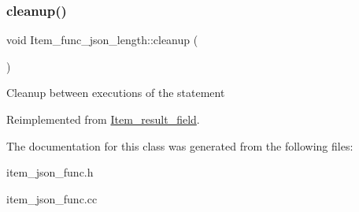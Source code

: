\subsubsection{\texorpdfstring{cleanup()}{cleanup()}}
{\footnotesize\ttfamily void Item\+\_\+func\+\_\+json\+\_\+length\+::cleanup (\begin{DoxyParamCaption}{ }\end{DoxyParamCaption})\hspace{0.3cm}{\ttfamily [virtual]}}

Cleanup between executions of the statement 

Reimplemented from \mbox{\hyperlink{classItem__result__field}{Item\+\_\+result\+\_\+field}}.



The documentation for this class was generated from the following files\+:\begin{DoxyCompactItemize}
\item 
item\+\_\+json\+\_\+func.\+h\item 
item\+\_\+json\+\_\+func.\+cc\end{DoxyCompactItemize}
